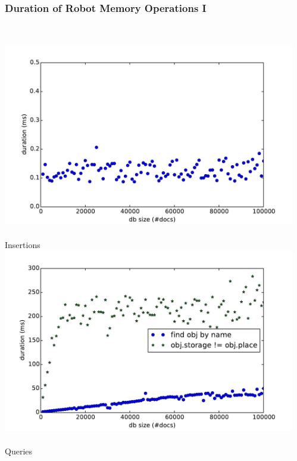 \begin{frame}
  \frametitle{Duration of Robot Memory Operations I}
  \centering
  \begin{columns}
    \begin{column}{0.55\textwidth}
  \centering
    \small
    \\\vspace{-0.15cm}
    \includegraphics[width=\textwidth]{../thesis/plots/insert-durations}\\
    \\\vspace{-0.05cm}
    Insertions
    \\\vspace{-0.05cm}
    \includegraphics[width=\textwidth]{../thesis/plots/query-durations}\\
    \\\vspace{-0.08cm}
    Queries
    \end{column}
    \begin{column}{0.55\textwidth}

\end{column}
\end{columns}
\end{frame}
